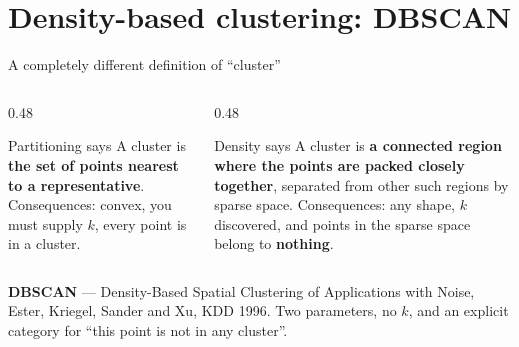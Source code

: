 \documentclass[aspectratio=169]{beamer}
\begin{document}
\section[DBSCAN]{Density-based clustering: DBSCAN}
\label{sec:dbscan}

\begin{frame}[shrink=6]{A completely different definition of ``cluster''}
  \begin{columns}[T]
    \begin{column}{0.48\textwidth}
      \begin{block}{Partitioning says}
        A cluster is \textbf{the set of points nearest to a representative}.
        Consequences: convex, you must supply $k$, every point is in a
        cluster.
      \end{block}
    \end{column}
    \begin{column}{0.48\textwidth}
      \begin{exampleblock}{Density says}
        A cluster is \textbf{a connected region where the points are packed
        closely together}, separated from other such regions by sparse
        space. Consequences: any shape, $k$ discovered, and points in the
        sparse space belong to \textbf{nothing}.
      \end{exampleblock}
    \end{column}
  \end{columns}
  \vspace{0.4em}
  \begin{alertblock}{}
    \centering
    \textbf{DBSCAN} --- Density-Based Spatial Clustering of Applications with
    Noise, Ester, Kriegel, Sander and Xu, KDD 1996. Two parameters, no $k$,
    and an explicit category for ``this point is not in any cluster''.
  \end{alertblock}
\end{frame}
\end{document}
